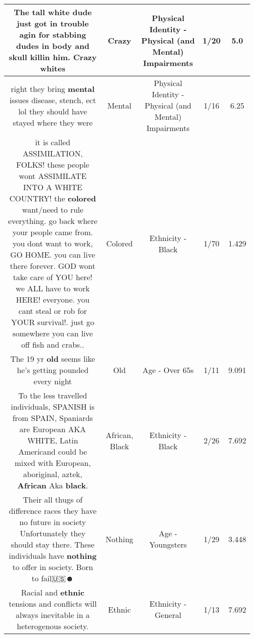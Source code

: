 \documentclass[11pt]{article}
\newlength\mylength
\begin{document}
\begin{center}
\begin{longtable}{|C{.65\mylength}|C{.30\mylength}|C{.12\mylength}|C{.12\mylength}|C{.12\mylength}|}
  \small The tall white dude just got in trouble agin for stabbing dudes in body and skull killin him. \textbf{Crazy} whites\normalsize   & Crazy & Physical Identity - Physical (and Mental) Impairments & 1/20 & 5.0 \\  \hline
  \small right they bring \textbf{mental} issues disease, stench, ect lol they should have stayed where they were\normalsize   & Mental & Physical Identity - Physical (and Mental) Impairments & 1/16 & 6.25 \\  \hline
  \small it is called ASSIMILATION, FOLKS! these people wont ASSIMILATE INTO A WHITE COUNTRY! the \textbf{colored} want/need to rule everything. go back where your people came from. you dont want to work, GO HOME. you can live there forever. GOD wont take care of YOU here! we ALL have to work HERE! everyone. you cant steal or rob for YOUR survival!. just go somewhere you can live off fish and crabs..\normalsize   & Colored & Ethnicity - Black & 1/70 & 1.429 \\  \hline
  \small The 19 yr \textbf{old} seems like he's getting pounded every night\normalsize   & Old & Age - Over 65s & 1/11 & 9.091 \\  \hline
  \small To the less travelled individuals, SPANISH is from SPAIN, Spaniards are European AKA WHITE, Latin Americand could be  mixed with European, aboriginal,  aztek, \textbf{African} Aka \textbf{black}.\normalsize   & African, Black & Ethnicity - Black & 2/26 & 7.692 \\  \hline
  \small Their all thugs of difference races they have no future in society Unfortunately they should stay there. These individuals have \textbf{nothing} to offer in society. Born to fail🇺🇸☻\normalsize   & Nothing & Age - Youngsters & 1/29 & 3.448 \\  \hline
  \small Racial and \textbf{ethnic} tensions and conflicts will always inevitable in a heterogenous society.\normalsize   & Ethnic & Ethnicity - General & 1/13 & 7.692 \\  \hline

\end{longtable}
\end{center}
\end{document}
